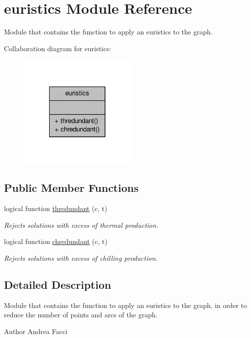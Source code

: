 \hypertarget{classeuristics}{\section{euristics Module Reference}
\label{classeuristics}
}


Module that contains the function to apply an euristics to the graph.  




Collaboration diagram for euristics\-:\nopagebreak
\begin{figure}[H]
\begin{center}
\leavevmode
\includegraphics[width=164pt]{classeuristics__coll__graph}
\end{center}
\end{figure}
\subsection*{Public Member Functions}
\begin{DoxyCompactItemize}
\item 
logical function \hyperlink{classeuristics_a1fea2abd84fede7cc3905d9983e374e0}{thredundant} (c, t)
\begin{DoxyCompactList}\small\item\em Rejects solutions with excess of thermal production. \end{DoxyCompactList}\item 
logical function \hyperlink{classeuristics_ab4b148eaf23e6a4fd686423477b8ee82}{chredundant} (c, t)
\begin{DoxyCompactList}\small\item\em Rejects solutions with excess of chilling production. \end{DoxyCompactList}\end{DoxyCompactItemize}


\subsection{Detailed Description}
Module that contains the function to apply an euristics to the graph. in order to reduce the number of points and arcs of the graph. \begin{DoxyAuthor}{Author}
Andrea Facci 
\end{DoxyAuthor}



